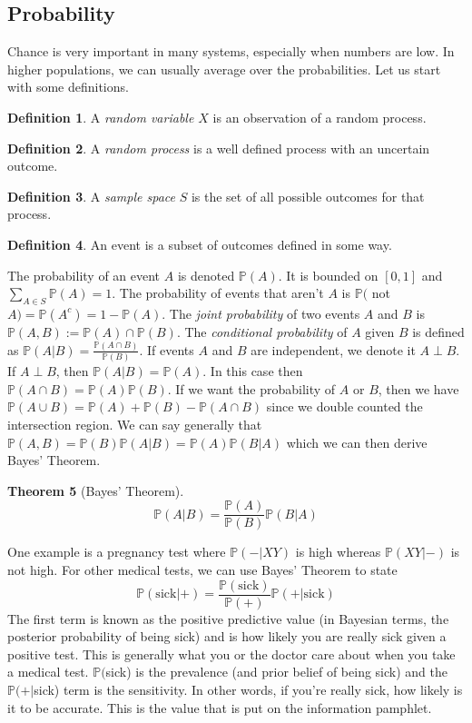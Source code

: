 \documentclass{article}
\newcommand{\p}{\mathbb{P}}
\newtheorem{theorem}{Theorem}[section]
\theoremstyle{definition}
\newtheorem{definition}[theorem]{Definition}
\begin{document}
\subsection{Probability}
Chance is very important in many systems, especially when numbers are low. In higher populations, we can usually average over the probabilities. Let us start with some definitions. 
\begin{definition}
    A \emph{random variable $X$} is an observation of a random process.
\end{definition}
\begin{definition}
    A \emph{random process} is a well defined process with an uncertain outcome.
\end{definition}
\begin{definition}
    A \emph{sample space} $S$ is the set of all possible outcomes for that process.
\end{definition}
\begin{definition}
    An event is a subset of outcomes defined in some way.
\end{definition}
The probability of an event $A$ is denoted $\p (A)$. It is bounded on $[0,1]$ and $\displaystyle{\sum_{A\in S} \p(A)}=1$. The probability of events that aren't $A$ is $\p ($ not $A) = \p (A^c)=1-\p(A)$. The \emph{joint probability} of two events $A$ and $B$ is $\p (A,B):= \p(A) \cap \p(B)$. The \emph{conditional probability} of $A$ given $B$ is defined as $\p(A|B) =\frac{\p(A\cap B)}{\p(B)}$. If events $A$ and $B$ are independent, we denote it $A\perp B$. If $A \perp B$, then $\p(A|B) = \p(A)$. In this case then $\p (A\cap B) = \p (A)\p(B)$. If we want the probability of $A$ or $B$, then we have $\p(A\cup B) = \p (A) + \p(B) -\p(A\cap B)$ since we double counted the intersection region. We can say generally that $\p(A,B) = \p(B)\p(A|B) =\p(A)\p(B|A)$ which we can then derive Bayes' Theorem.
\begin{theorem}[Bayes' Theorem]
    \begin{equation*}
        \p(A|B)  = \frac{\p(A)}{\p(B)} \p(B|A)
    \end{equation*}
\end{theorem}
One example is a pregnancy test where $\p (-|XY)$ is high whereas $\p(XY|-)$ is not high. For other medical tests, we can use Bayes' Theorem to state 
\begin{equation*}
    \p(\text{sick}|+) = \frac{\p(\text{sick})}{\p(+)}\p(+|\text{sick})
\end{equation*}
The first term is known as the positive predictive value (in Bayesian terms, the posterior probability of being sick) and is how likely you are really sick given a positive test. This is generally what you or the doctor care about when you take a medical test. $\p ($sick) is the prevalence (and prior belief of being sick) and the $\p(+|$sick) term is the sensitivity. In other words, if you're really sick, how likely is it to be accurate. This is the value that is put on the information pamphlet. 
\end{document}
